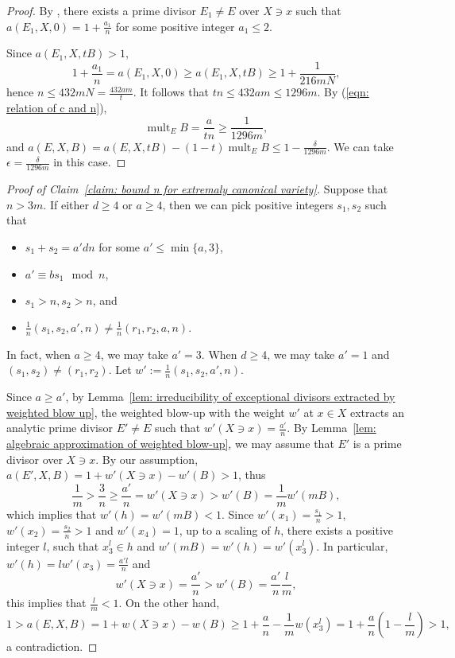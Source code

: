 \documentclass[11pt]{amsart}
\numberwithin{equation}{section}
\newcommand{\mult}{\operatorname{mult}}
\theoremstyle{definition}
\theoremstyle{definition}
\begin{document}
\begin{proof}
\medskip

By \cite[4.8 Corollary]{Sho94a}, there exists a prime divisor $E_1\neq E$ over $X\ni x$ such that $a(E_1,X,0)= 1+\frac{a_1}{n}$ for some positive integer $a_1\leq 2$.


\medskip

Since $a(E_1,X,tB)>1$, $$1+\frac{a_1}{n}=a(E_1,X,0)\geq a(E_1,X,tB)\geq 1+\frac{1}{216mN},$$ hence $n\leq 432mN=\frac{432am}{t}$. It follows that $tn\leq 432am\leq 1296m$. By (\ref{eqn: relation of c and n}),
$$\mult_E B=\frac{a}{tn}\geq \frac{1}{1296m},$$ and $a(E,X,B)=a(E,X,tB)-(1-t)\mult_EB\leq 1-\frac{\delta}{1296m}$. We can take $\epsilon=\frac{\delta}{1296m}$ in this case.
\end{proof}


\begin{proof}[Proof of Claim~\ref{claim: bound n for extremaly canonical variety}]
Suppose that $n>3m$. If either $d\geq 4$ or $a\geq 4$, then we can pick positive integers $s_1,s_2$ such that
\begin{itemize}
    \item $s_1+s_2=a'dn$ for some $a'\leq \min\{a,3\}$,
    \item $a'\equiv bs_1\mod n$,
    \item $s_1>n,s_2>n$, and
    \item $\frac{1}{n}(s_1,s_2,a',n)\neq \frac{1}{n}(r_1,r_2,a,n)$.
\end{itemize}
In fact, when $a\geq 4$, we may take $a'=3$. When $d\geq 4$, we may take $a'=1$ and $(s_1,s_2)\neq (r_1,r_2)$. Let $ w':=\frac{1}{n}(s_1,s_2,a',n)$.

Since $a\geq a'$, by Lemma~\ref{lem: irreducibility of exceptional divisors extracted by weighted blow up}, the weighted blow-up with the weight $w'$ at $x\in X$ extracts an analytic prime divisor $E'\neq E$ such that $w'(X\ni x)=\frac{a'}{n}$. By Lemma~\ref{lem: algebraic approximation of weighted blow-up}, we may assume that $E'$ is a prime divisor over $X\ni x$. By our assumption, $a({E'},X,B)=1+{w'}(X\ni x)-{w'}(B)> 1$, thus
$$\frac{1}{m}>\frac{3}{n}\geq \frac{a'}{n}=w'(X\ni x)>  w'(B)=\frac{1}{m}w'(mB),$$
which implies that $w'(h)= w'(mB)<1$.
Since $ w'(x_1)=\frac{s_1}{n}>1$, $w'(x_2)=\frac{s_2}{n}>1$ and $w'(x_4)=1$, up to a scaling of $h$, there exists a positive integer $l$, such that $x_3^{l}\in h$ and ${w'}(mB)=w'(h)= w'(x_3^{l})$. In particular, $w'(h)=l w'(x_3)=\frac{a'l}{n}$ and
$$w'(X\ni x)=\frac{a'}{n}> w'(B)=\frac{a'}{n}\frac{l}{m},$$
this implies that $\frac{l}{m}< 1$. On the other hand,
$$1>a(E,X,B)=1+w(X\ni x)-w(B)\geq 1+\frac{a}{n}- \frac{1}{m}w(x_3^l)=1+\frac{a}{n}(1-\frac{l}{m})>1,$$
a contradiction.
\end{proof}
\end{document}
